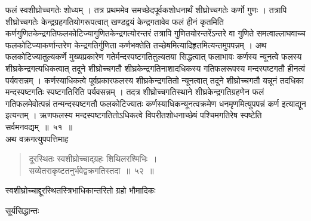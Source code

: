 \documentclass[11pt, openany]{book}
\begin{document}
\begin{sloppypar}
\noindent फलं स्वशीघ्रोच्चगतेः शोध्यम् । तत्र प्रथममेव समच्छेदपूर्वकशोधनार्थं शीघ्रोच्चगतेः कर्णो गुणः । तत्रापि शीघ्रोच्चगतेः केन्द्रग्रहगतियोगरूपत्वात् खण्डद्वयं केन्द्रगतावेव फलं हीनं कृतमिति कर्णगुणितकेन्द्रगतिफलकोटिज्यागुणितकेन्द्रगत्योरन्तरं तत्रापि गुणितयोरन्तरेंऽन्तरे वा गुणिते समत्वाल्लाघवाच्च फलकोटिज्याकर्णान्तरेण केन्द्रगतिर्गुणिता कर्णभक्तेति तच्छेषमित्यादिहृतमित्यन्तमुपपन्नम् । अथ फलकोटिज्यातुल्यकर्णे मुख्यप्रकारेण गतेर्मन्दस्पष्टगतितुल्यतया सिद्धत्वात् फलाभावः कर्णस्य न्यूनत्वे फलस्य शीघ्रकेन्द्रगत्यधिकत्वात् तदूने शीघ्रोच्चगतौ शीघ्रकेन्द्रगतिनाशादधिकस्य गतिफलरूपस्य मन्दस्पष्टगतौ हीनत्वं पर्यवसन्नम् । कर्णस्याधिकत्वे पूर्वप्रकारफलस्य शीघ्रकेन्द्रगतितो न्यूनत्वात् तदूने शीघ्रोच्चगतौ यन्नूनं तदधिका मन्दस्पष्टगतिः स्पष्टगतिरिति पर्यवसन्नम् । तदत्र शीघ्रोच्चगतिस्थाने शीघ्रकेन्द्रगतिग्रहणेन फलं गतिफलमेवोत्पन्नं तन्मन्दस्पष्टगतौ फलकोटिज्यातः कर्णस्याधिकन्यूनत्वक्रमेण धनमृणमित्युपपन्नं कर्ण इत्याद्यून इत्यन्तम् । ऋणफलस्य मन्दस्पष्टगतितोऽधिकत्वे विपरीतशोधनाच्छेषं पश्चिमगतिरेष स्पष्टेति सर्वमनवद्यम्~॥~५१~॥\\
\noindent अथ वक्रगत्युपपत्तिमाह\textendash
\end{sloppypar}
\begin{quote}
{\ssi दूरस्थितः स्वशीघ्रोच्चाद्ग्रहः शिथिलरश्मिभिः~।\\
सव्येतराकृष्टतनुर्भवेद्वक्रगतिस्तदा~॥~५२~॥}
\end{quote}
{\setlength{\parindent}{5em}
स्वशीघ्रोच्चाद्दूरस्थितस्त्रिभाधिकान्तरितो ग्रहो भौमादिकः}


\newpage


\hspace{3cm}सूर्यसिद्धान्तः
\vspace{1cm}
\end{document}
